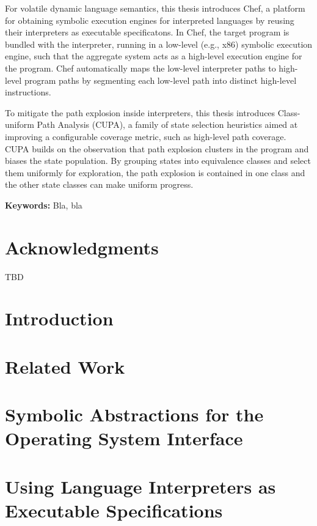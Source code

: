 \documentclass[letterpaper,10pt,oneside]{book}
\begin{document}
For volatile dynamic language semantics, this thesis introduces Chef, a platform for obtaining symbolic execution engines for interpreted languages by reusing their interpreters as executable specificatons.  In Chef, the target program is bundled with the interpreter, running in a low-level (e.g., x86) symbolic execution engine, such that the aggregate system acts as a high-level execution engine for the program.
%
Chef automatically maps the low-level interpreter paths to high-level program paths by segmenting each low-level path into distinct high-level instructions.

To mitigate the path explosion inside interpreters, this thesis introduces Class-uniform Path Analysis (CUPA), a family of state selection heuristics aimed at improving a configurable coverage metric, such as high-level path coverage.  CUPA builds on the observation that path explosion clusters in the program and biases the state population.  By grouping states into equivalence classes and select them uniformly for exploration, the path explosion is contained in one class and the other state classes can make uniform progress.


\noindent \textbf{Keywords:} Bla, bla


\chapter*{Acknowledgments}

TBD

\tableofcontents
\listoffigures
\listoftables

\chapter{Introduction}
\label{ch:introduction}



\chapter{Related Work}
\label{ch:relatedwork}



\chapter{Symbolic Abstractions for the Operating System Interface}
\label{ch:cloud9}


\chapter{Using Language Interpreters as Executable Specifications}
\label{ch:chef}

\end{document}
